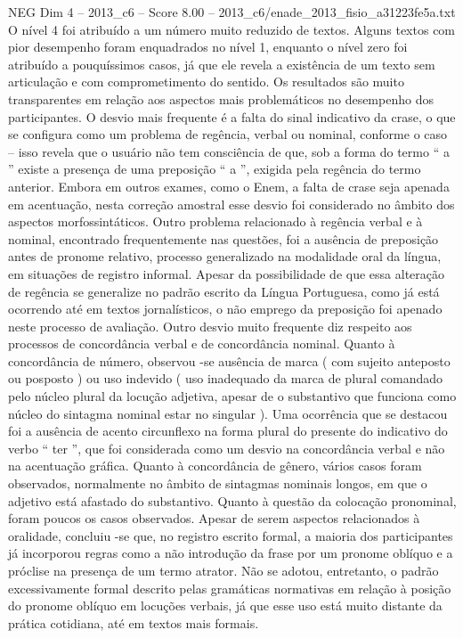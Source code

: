 \begin{textsample}{NEG Dim 4 – 2013\_c6 – Score 8.00 – 2013\_c6/enade\_2013\_fisio\_a31223fe5a.txt}
O nível 4 foi atribuído a um número muito reduzido de textos.
Alguns textos com pior desempenho foram enquadrados no nível 1, enquanto o nível zero foi atribuído a pouquíssimos casos, já que ele revela a existência de um texto sem articulação e com comprometimento do sentido.
Os resultados são muito transparentes em relação aos aspectos mais problemáticos no desempenho dos participantes.
O desvio mais frequente é a falta do sinal indicativo da crase, o que se configura como um problema de regência, verbal ou nominal, conforme o caso – isso revela que o usuário não tem consciência de que, sob a forma do termo “ a ” existe a presença de uma preposição “ a ”, exigida pela regência do termo anterior.
Embora em outros exames, como o Enem, a falta de crase seja apenada em acentuação, nesta correção amostral esse desvio foi considerado no âmbito dos aspectos morfossintáticos.
Outro problema relacionado à regência verbal e à nominal, encontrado frequentemente nas questões, foi a ausência de preposição antes de pronome relativo, processo generalizado na modalidade oral da língua, em situações de registro informal.
Apesar da possibilidade de que essa alteração de regência se generalize no padrão escrito da Língua Portuguesa, como já está ocorrendo até em textos jornalísticos, o não emprego da preposição foi apenado neste processo de avaliação.
Outro desvio muito frequente diz respeito aos processos de concordância verbal e de concordância nominal.
Quanto à concordância de número, observou -se ausência de marca ( com sujeito anteposto ou posposto ) ou uso indevido ( uso inadequado da marca de plural comandado pelo núcleo plural da locução adjetiva, apesar de o substantivo que funciona como núcleo do sintagma nominal estar no singular ).
Uma ocorrência que se destacou foi a ausência de acento circunflexo na forma plural do presente do indicativo do verbo “ ter ”, que foi considerada como um desvio na concordância verbal e não na acentuação gráfica.
Quanto à concordância de gênero, vários casos foram observados, normalmente no âmbito de sintagmas nominais longos, em que o adjetivo está afastado do substantivo.
Quanto à questão da colocação pronominal, foram poucos os casos observados.
Apesar de serem aspectos relacionados à oralidade, concluiu -se que, no registro escrito formal, a maioria dos participantes já incorporou regras como a não introdução da frase por um pronome oblíquo e a próclise na presença de um termo atrator.
Não se adotou, entretanto, o padrão excessivamente formal descrito pelas gramáticas normativas em relação à posição do pronome oblíquo em locuções verbais, já que esse uso está muito distante da prática cotidiana, até em textos mais formais.

\end{textsample}
